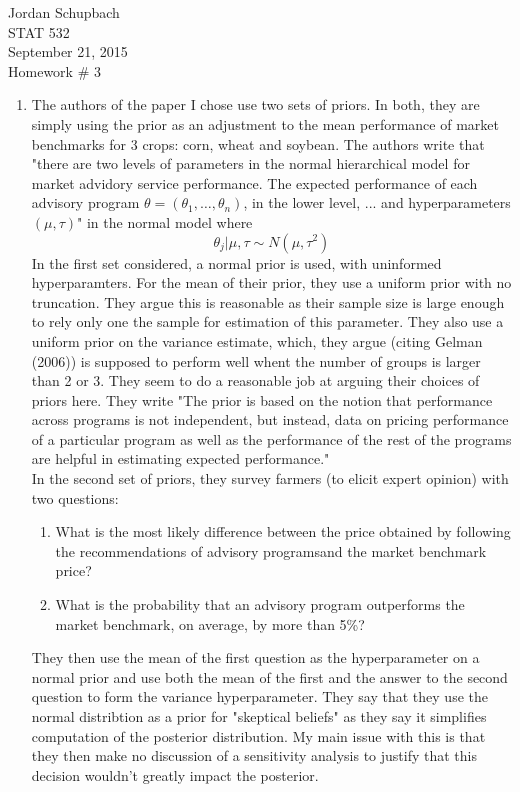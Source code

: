 \documentclass[12pt]{article}\usepackage[]{graphicx}\usepackage[]{color}
\begin{document}
{ \flushright Jordan Schupbach \\
STAT 532\\
September 21, 2015 \\}
Homework \# 3\\

\begin{enumerate}
\item The authors of the paper I chose use two sets of priors. In both, they are simply using the prior as an adjustment to the mean performance of market benchmarks for 3 crops: corn, wheat and soybean. The authors write that "there are two levels of parameters in the normal hierarchical model for market advidory service performance. The expected performance of each advisory program $\theta = (\theta_1, \dots, \theta_n)$, in the lower level, ... and hyperparameters $(\mu, \tau)$" in the normal model where
\[ \theta_j | \mu, \tau \sim N(\mu, \tau^2) \]
In the first set considered, a normal prior is used, with uninformed hyperparamters. For the mean of their prior, they use a uniform prior with no truncation. They argue this is reasonable as their sample size is large enough to rely only one the sample for estimation of this parameter. They also use a uniform prior on the variance estimate, which, they argue (citing Gelman (2006)) is supposed to perform well whent the number of groups is larger than 2 or 3. They seem to do a reasonable job at arguing their choices of priors here. They write "The prior is based on the notion that performance across programs is not independent, but instead, data on pricing performance of a particular program as well as the performance of the rest of the programs are helpful in estimating expected performance." \\

In the second set of priors, they survey farmers (to elicit expert opinion) with two questions:
\begin{enumerate}[label = (\alph*)]
\item What is the most likely difference between the price obtained by following the recommendations of advisory programsand the market benchmark price? 
\item What is the probability that an advisory program outperforms the market benchmark, on average, by more than 5\%?
\end{enumerate}

They then use the mean of the first question as the hyperparameter on a normal prior and use both the mean of the first and the answer to the second question to form the variance hyperparameter. They say that they use the normal distribtion as a prior for "skeptical beliefs" as they say it simplifies computation of the posterior distribution. My main issue with this is that they then make no discussion of a sensitivity analysis to justify that this decision wouldn't greatly impact the posterior. 


\end{enumerate}
\end{document}
